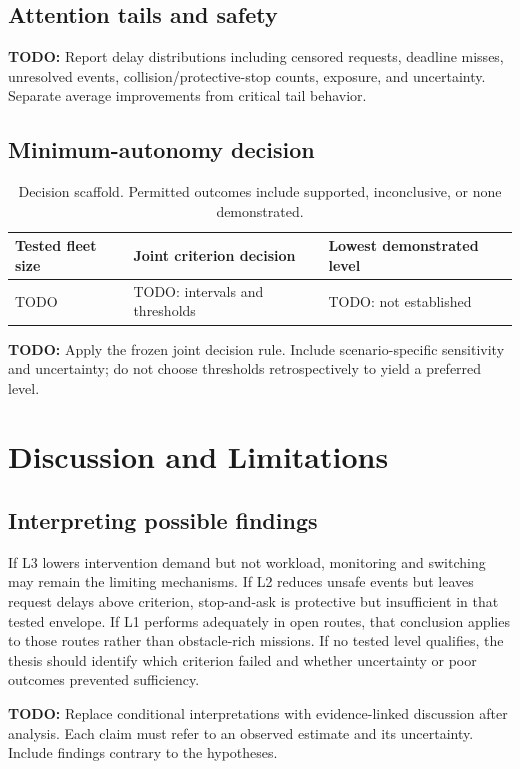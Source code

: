 \documentclass[12pt,oneside]{report}
\newcommand{\todo}[1]{\par\noindent\textcolor{red!65!black}{\textbf{TODO:} #1}\par}
\begin{document}
\section{Attention tails and safety}
\todo{Report delay distributions including censored requests, deadline misses, unresolved events, collision/protective-stop counts, exposure, and uncertainty. Separate average improvements from critical tail behavior.}
\section{Minimum-autonomy decision}
\begin{table}[htbp]\centering\begin{tabular}{p{.18\linewidth}p{.34\linewidth}p{.34\linewidth}}\toprule
Tested fleet size & Joint criterion decision & Lowest demonstrated level \\\midrule
TODO & TODO: intervals and thresholds & TODO: not established \\\bottomrule\end{tabular}\caption{Decision scaffold. Permitted outcomes include supported, inconclusive, or none demonstrated.}\end{table}
\todo{Apply the frozen joint decision rule. Include scenario-specific sensitivity and uncertainty; do not choose thresholds retrospectively to yield a preferred level.}
\chapter{Discussion and Limitations}
\section{Interpreting possible findings}
If L3 lowers intervention demand but not workload, monitoring and switching may remain the limiting mechanisms. If L2 reduces unsafe events but leaves request delays above criterion, stop-and-ask is protective but insufficient in that tested envelope. If L1 performs adequately in open routes, that conclusion applies to those routes rather than obstacle-rich missions. If no tested level qualifies, the thesis should identify which criterion failed and whether uncertainty or poor outcomes prevented sufficiency.

\todo{Replace conditional interpretations with evidence-linked discussion after analysis. Each claim must refer to an observed estimate and its uncertainty. Include findings contrary to the hypotheses.}
\end{document}
